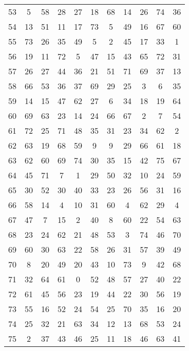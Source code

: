 \begin{table}
\begin{tabular}{c c c c c c c c c c c }
53 & 5 & 58 & 28 & 27 & 18 & 68 & 14 & 26 & 74 & 36 \\
54 & 13 & 51 & 11 & 17 & 73 & 5 & 49 & 16 & 67 & 60 \\
55 & 73 & 26 & 35 & 49 & 5 & 2 & 45 & 17 & 33 & 1 \\
56 & 19 & 11 & 72 & 5 & 47 & 15 & 43 & 65 & 72 & 31 \\
57 & 26 & 27 & 44 & 36 & 21 & 51 & 71 & 69 & 37 & 13 \\
58 & 66 & 53 & 36 & 37 & 69 & 29 & 25 & 3 & 6 & 35 \\
59 & 14 & 15 & 47 & 62 & 27 & 6 & 34 & 18 & 19 & 64 \\
60 & 69 & 63 & 23 & 14 & 24 & 66 & 67 & 2 & 7 & 54 \\
61 & 72 & 25 & 71 & 48 & 35 & 31 & 23 & 34 & 62 & 2 \\
62 & 63 & 19 & 68 & 59 & 9 & 9 & 29 & 66 & 61 & 18 \\
63 & 62 & 60 & 69 & 74 & 30 & 35 & 15 & 42 & 75 & 67 \\
64 & 45 & 71 & 7 & 1 & 29 & 50 & 32 & 10 & 24 & 59 \\
65 & 30 & 52 & 30 & 40 & 33 & 23 & 26 & 56 & 31 & 16 \\
66 & 58 & 14 & 4 & 10 & 31 & 60 & 4 & 62 & 29 & 4 \\
67 & 47 & 7 & 15 & 2 & 40 & 8 & 60 & 22 & 54 & 63 \\
68 & 23 & 24 & 62 & 21 & 48 & 53 & 3 & 74 & 46 & 70 \\
69 & 60 & 30 & 63 & 22 & 58 & 26 & 31 & 57 & 39 & 49 \\
70 & 8 & 20 & 49 & 20 & 43 & 10 & 73 & 9 & 42 & 68 \\
71 & 32 & 64 & 61 & 0 & 52 & 48 & 57 & 27 & 40 & 22 \\
72 & 61 & 45 & 56 & 23 & 19 & 44 & 22 & 30 & 56 & 19 \\
73 & 55 & 16 & 52 & 24 & 54 & 25 & 70 & 35 & 16 & 20 \\
74 & 25 & 32 & 21 & 63 & 34 & 12 & 13 & 68 & 53 & 24 \\
75 & 2 & 37 & 43 & 46 & 25 & 11 & 18 & 46 & 63 & 41 \\
\hline
\end{tabular}
\end{table}